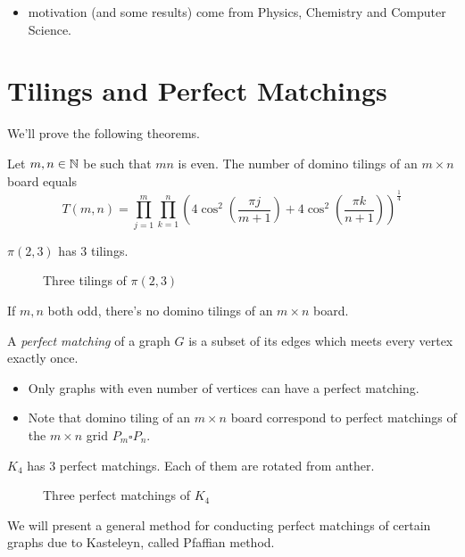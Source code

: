 \begin{itemize}
\item motivation (and some results) come from Physics, Chemistry and Computer Science.
\end{itemize}

\section{Tilings and Perfect Matchings}
We'll prove the following theorems.
\begin{theorem}[Kasteleyn (1961)]
Let \(m,n\in\mathbb{N}\) be such that \(mn\) is even.
The number of domino tilings of an \(m\times n\) board equals
\[ T(m,n)=\prod_{j=1}^{m}\prod_{k=1}^n \left(4\cos^2\left(\frac{\pi j}{m+1}\right) + 4\cos^2\left(\frac{\pi k}{n+1}\right)\right)^{\frac{1}{4}} \]
\end{theorem}
\begin{example}
\(\pi(2,3)\) has 3 tilings.
\begin{figure}[h]
    \caption{Three tilings of \(\pi(2,3)\)}
\end{figure}
\end{example}
\begin{remark}
If \(m,n\) both odd, there's no domino tilings of an \(m\times n\) board.
\end{remark}


\begin{definition}
A \emph{perfect matching} of a graph \(G\) is a subset of its edges which meets every vertex exactly once.
\end{definition}
\begin{remark}
\begin{flushleft}\end{flushleft}
\begin{itemize}
    \item Only graphs with even number of vertices can have a perfect matching.
    \item Note that domino tiling of an \(m\times n\) board correspond to perfect matchings of the \(m\times n\) grid \(P_m\square P_n\).
\end{itemize}
\end{remark}
\begin{example}
\(K_4\) has 3 perfect matchings. Each of them are rotated from anther.
\begin{figure}[ht]
    \caption{Three perfect matchings of \(K_4\)}
\end{figure}
\end{example}
We will present a general method for conducting perfect matchings of certain graphs due to Kasteleyn, called Pfaffian method.

